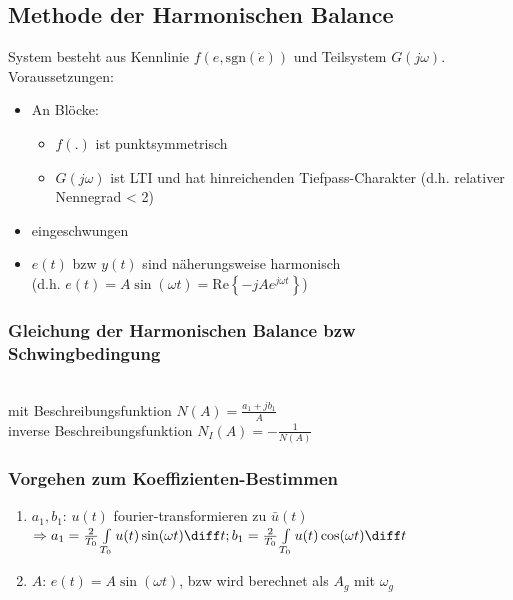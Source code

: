 \documentclass[german]{latex4ei/latex4ei_sheet}
\begin{document}
\begin{sectionbox}
\subsection{Methode der Harmonischen Balance}

System besteht aus Kennlinie $f(e, \text{sgn}(\dot{e}))$ und Teilsystem $G(j\omega)$. \\
Voraussetzungen:
\begin{itemize}
  \item An Blöcke:
    \begin{itemize}
      \item $f(.)$ ist punktsymmetrisch
      \item $G(j\omega)$ ist LTI und hat hinreichenden Tiefpass-Charakter (d.h. relativer Nennegrad < 2)
    \end{itemize}
  \item eingeschwungen
  \item $e(t)$ bzw $y(t)$ sind näherungsweise harmonisch \\ (d.h. $e(t) = A \sin(\omega t) = \text{Re} \left\{ -j A e^{j\omega t} \right\}$)
\end{itemize}

\subsubsection{Gleichung der Harmonischen Balance bzw Schwingbedingung}
 \\
mit Beschreibungsfunktion $N(A) = \frac{a_1 + j b_1}{A}$ \\
inverse Beschreibungsfunktion $N_I(A) = - \frac{1}{N(A)}$ \\

\subsubsection{Vorgehen zum Koeffizienten-Bestimmen}

\begin{enumerate}
  \item $a_1, b_1$:  $u(t)$ fourier-transformieren zu $\bar{u}(t)$ \\
    $\Rightarrow a_1 = \frac{2}{T_0} \int\limits_{T_0} u(t) \sin(\omega t) \diff t; \\
                 b_1 = \frac{2}{T_0} \int\limits_{T_0} u(t) \cos(\omega t) \diff t$
  \item $A$: $e(t) = A \sin(\omega t)$, bzw wird berechnet als $A_g$ mit $\omega_g$
\end{enumerate}


\end{sectionbox}
\end{document}
